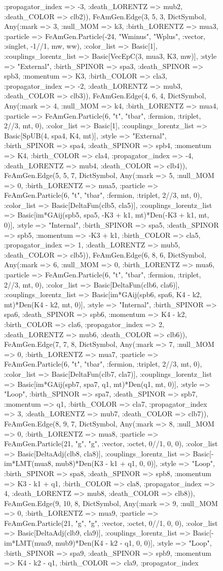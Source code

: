 \documentclass{revtex4}
\begin{document}
\begin{figure}[!htb]
\begin{center}
{:propagator_index => -3, :death_LORENTZ => mub2, :death_COLOR => clb2)), FeAmGen.Edge(3, 5, 3, Dict{Symbol, Any}(:mark => 3, :null_MOM => k3, :birth_LORENTZ => mua3, :particle => FeAmGen.Particle(-24, "Wminus", "Wplus", :vector, :singlet, -1//1, mw, ww), :color_list => Basic[1], :couplings_lorentz_list => Basic[VecEpC(3, mua3, K3, mw)], :style => "External", :birth_SPINOR => spa3, :death_SPINOR => spb3, :momentum => K3, :birth_COLOR => cla3, :propagator_index => -2, :death_LORENTZ => mub3, :death_COLOR => clb3)), FeAmGen.Edge(4, 6, 4, Dict{Symbol, Any}(:mark => 4, :null_MOM => k4, :birth_LORENTZ => mua4, :particle => FeAmGen.Particle(6, "t", "tbar", :fermion, :triplet, 2//3, mt, 0), :color_list => Basic[1], :couplings_lorentz_list => Basic[SpUB(4, spa4, K4, mt)], :style => "External", :birth_SPINOR => spa4, :death_SPINOR => spb4, :momentum => K4, :birth_COLOR => cla4, :propagator_index => -4, :death_LORENTZ => mub4, :death_COLOR => clb4)), FeAmGen.Edge(5, 5, 7, Dict{Symbol, Any}(:mark => 5, :null_MOM => 0, :birth_LORENTZ => mua5, :particle => FeAmGen.Particle(6, "t", "tbar", :fermion, :triplet, 2//3, mt, 0), :color_list => Basic[DeltaFun(clb5, cla5)], :couplings_lorentz_list => Basic[im*GAij(spb5, spa5, -K3 + k1, mt)*Den(-K3 + k1, mt, 0)], :style => "Internal", :birth_SPINOR => spa5, :death_SPINOR => spb5, :momentum => -K3 + k1, :birth_COLOR => cla5, :propagator_index => 1, :death_LORENTZ => mub5, :death_COLOR => clb5)), FeAmGen.Edge(6, 8, 6, Dict{Symbol, Any}(:mark => 6, :null_MOM => 0, :birth_LORENTZ => mua6, :particle => FeAmGen.Particle(6, "t", "tbar", :fermion, :triplet, 2//3, mt, 0), :color_list => Basic[DeltaFun(clb6, cla6)], :couplings_lorentz_list => Basic[im*GAij(spb6, spa6, K4 - k2, mt)*Den(K4 - k2, mt, 0)], :style => "Internal", :birth_SPINOR => spa6, :death_SPINOR => spb6, :momentum => K4 - k2, :birth_COLOR => cla6, :propagator_index => 2, :death_LORENTZ => mub6, :death_COLOR => clb6)), FeAmGen.Edge(7, 7, 8, Dict{Symbol, Any}(:mark => 7, :null_MOM => 0, :birth_LORENTZ => mua7, :particle => FeAmGen.Particle(6, "t", "tbar", :fermion, :triplet, 2//3, mt, 0), :color_list => Basic[DeltaFun(clb7, cla7)], :couplings_lorentz_list => Basic[im*GAij(spb7, spa7, q1, mt)*Den(q1, mt, 0)], :style => "Loop", :birth_SPINOR => spa7, :death_SPINOR => spb7, :momentum => q1, :birth_COLOR => cla7, :propagator_index => 3, :death_LORENTZ => mub7, :death_COLOR => clb7)), FeAmGen.Edge(8, 9, 7, Dict{Symbol, Any}(:mark => 8, :null_MOM => 0, :birth_LORENTZ => mua8, :particle => FeAmGen.Particle(21, "g", "g", :vector, :octet, 0//1, 0, 0), :color_list => Basic[DeltaAdj(clb8, cla8)], :couplings_lorentz_list => Basic[-im*LMT(mua8, mub8)*Den(K3 - k1 + q1, 0, 0)], :style => "Loop", :birth_SPINOR => spa8, :death_SPINOR => spb8, :momentum => K3 - k1 + q1, :birth_COLOR => cla8, :propagator_index => 4, :death_LORENTZ => mub8, :death_COLOR => clb8)), FeAmGen.Edge(9, 10, 8, Dict{Symbol, Any}(:mark => 9, :null_MOM => 0, :birth_LORENTZ => mua9, :particle => FeAmGen.Particle(21, "g", "g", :vector, :octet, 0//1, 0, 0), :color_list => Basic[DeltaAdj(clb9, cla9)], :couplings_lorentz_list => Basic[-im*LMT(mua9, mub9)*Den(K4 - k2 - q1, 0, 0)], :style => "Loop", :birth_SPINOR => spa9, :death_SPINOR => spb9, :momentum => K4 - k2 - q1, :birth_COLOR => cla9, :propagator_index }
\end{center}
\end{figure}
\end{document}
